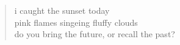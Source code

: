 \begin{verse}
i caught the sunset today \\
pink flames singeing fluffy clouds \\
do you bring the future, or recall the past?
\end{verse}
